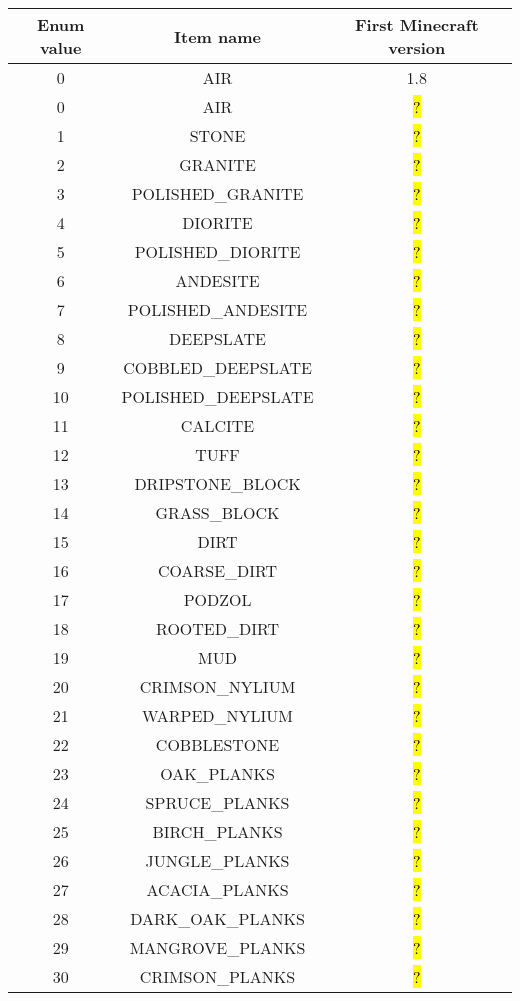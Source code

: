\documentclass[11pt]{article}
\newcommand\myworries[1]{\sethlcolor{red}\hl{#1}}
\begin{document}
\begin{longtable}{ |c|c|c| }
	\hline
	Enum value & Item name & First Minecraft version \\
	\hline
	\endhead
	0 & AIR & 1.8 \\
0 & AIR & \myworries{?} \\
1 & STONE & \myworries{?} \\
2 & GRANITE & \myworries{?} \\
3 & POLISHED\_GRANITE & \myworries{?} \\
4 & DIORITE & \myworries{?} \\
5 & POLISHED\_DIORITE & \myworries{?} \\
6 & ANDESITE & \myworries{?} \\
7 & POLISHED\_ANDESITE & \myworries{?} \\
8 & DEEPSLATE & \myworries{?} \\
9 & COBBLED\_DEEPSLATE & \myworries{?} \\
10 & POLISHED\_DEEPSLATE & \myworries{?} \\
11 & CALCITE & \myworries{?} \\
12 & TUFF & \myworries{?} \\
13 & DRIPSTONE\_BLOCK & \myworries{?} \\
14 & GRASS\_BLOCK & \myworries{?} \\
15 & DIRT & \myworries{?} \\
16 & COARSE\_DIRT & \myworries{?} \\
17 & PODZOL & \myworries{?} \\
18 & ROOTED\_DIRT & \myworries{?} \\
19 & MUD & \myworries{?} \\
20 & CRIMSON\_NYLIUM & \myworries{?} \\
21 & WARPED\_NYLIUM & \myworries{?} \\
22 & COBBLESTONE & \myworries{?} \\
23 & OAK\_PLANKS & \myworries{?} \\
24 & SPRUCE\_PLANKS & \myworries{?} \\
25 & BIRCH\_PLANKS & \myworries{?} \\
26 & JUNGLE\_PLANKS & \myworries{?} \\
27 & ACACIA\_PLANKS & \myworries{?} \\
28 & DARK\_OAK\_PLANKS & \myworries{?} \\
29 & MANGROVE\_PLANKS & \myworries{?} \\
30 & CRIMSON\_PLANKS & \myworries{?} \\

\end{longtable}
\end{document}

